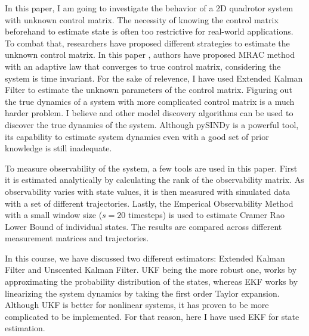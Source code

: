 \documentclass[12pt]{article}
\begin{document}
In this paper, I am going to investigate the behavior of a 2D quadrotor system with unknown control matrix. The necessity of knowing the control matrix beforehand to estimate state is often too restrictive for real-world applications. To combat that, researchers have proposed different strategies to estimate the unknown control matrix. In this paper \cite{Kong_2019}
, authors have proposed MRAC method with an adaptive law that converges to true control matrix, considering the system is time invariant. For the sake of relevence, I have used Extended Kalman Filter to estimate the unknown parameters of the control matrix. Figuring out the true dynamics of a system with more complicated control matrix is a much harder problem. I believe \cite{Brunton_2016} and other model discovery algorithms can be used to discover the true dynamics of the system. Although pySINDy is a powerful tool, its capability to estimate system dynamics even with a good set of prior knowledge is still inadequate.

To measure observability of the system, a few tools are used in this paper. First it is estimated analytically by calculating the rank of the observability matrix. As observability varies with state values, it is then measured with simulated data with a set of different trajectories. Lastly, the Emperical Observability Method with a small window size ($s=20$ timesteps) is used to estimate Cramer Rao Lower Bound of individual states. The results are compared across different measurement matrices and trajectories.

In this course, we have discussed two different estimators: Extended Kalman Filter and Unscented Kalman Filter. UKF being the more robust one, works by approximating the probability distribution of the states, whereas EKF works by linearizing the system dynamics by taking the first order Taylor expansion. Although UKF is better for nonlinear systems, it has proven to be more complicated to be implemented. For that reason, here I have used EKF for state estimation.
\end{document}

